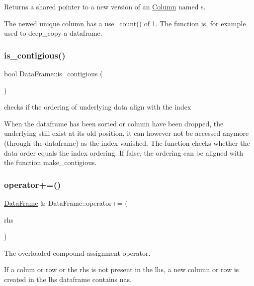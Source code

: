 Returns a shared pointer to a new version of an \hyperlink{classColumn}{Column} named s. 

The newed unique column has a use\+\_\+count() of 1. The function is, for example used to deep\+\_\+copy a dataframe. \mbox{\label{classDataFrame_a40f6420c823601946d56ba625484a74e}} 
\subsubsection{\texorpdfstring{is\+\_\+contigious()}{is\_contigious()}}
{\footnotesize\ttfamily bool Data\+Frame\+::is\+\_\+contigious (\begin{DoxyParamCaption}{ }\end{DoxyParamCaption})}



checks if the ordering of underlying data align with the index 

When the dataframe has been sorted or column have been dropped, the underlying still exist at its old position, it can however not be accessed anymore (through the dataframe) as the index vanished. The function checks whether the data order equals the index ordering. If false, the ordering can be aligned with the function {\ttfamily make\+\_\+contigious}. \mbox{\label{classDataFrame_a61f3301cc72548b4b3536c0844fb156d}} 
\subsubsection{\texorpdfstring{operator+=()}{operator+=()}}
{\footnotesize\ttfamily \hyperlink{classDataFrame}{Data\+Frame} \& Data\+Frame\+::operator+= (\begin{DoxyParamCaption}\item[{const \hyperlink{classDataFrame}{Data\+Frame} \&}]{rhs }\end{DoxyParamCaption})}



The overloaded compound-\/assignment operator. 

If a colum or row or the rhs is not present in the lhs, a new column or row is created in the lhs dataframe contains nas. \mbox{\label{classDataFrame_a72c1c51a9562d55269477dabcc61ad12}} 
